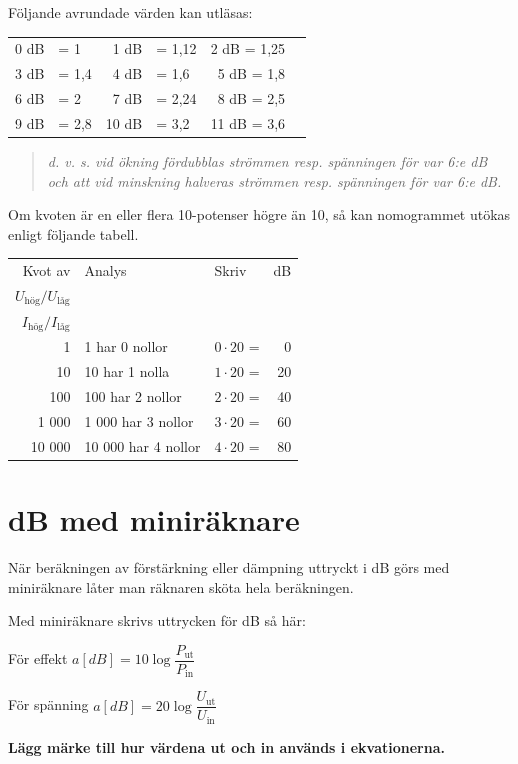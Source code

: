 Följande avrundade värden kan utläsas:

\begin{tabular}{rlrlrl}
0 dB & = 1   &  1 dB & = 1,12 &  2 dB = 1,25 \\
3 dB & = 1,4 &  4 dB & = 1,6  &  5 dB = 1,8 \\
6 dB & = 2   &  7 dB & = 2,24 &  8 dB = 2,5 \\
9 dB & = 2,8 & 10 dB & = 3,2  & 11 dB = 3,6
\end{tabular}

\begin{quote}\emph{
d. v. s. vid ökning fördubblas strömmen resp. spänningen för var 6:e dB och att
vid minskning halveras strömmen resp. spänningen för var 6:e dB.
}\end{quote}

Om kvoten är en eller flera 10-potenser högre än 10, så kan nomogrammet utökas
enligt följande tabell.

\begin{tabular}{rllr}
Kvot av & Analys             & Skriv            & dB \\
\(U_\text{hög}/U_\text{låg}\) &          &                  &    \\
\(I_\text{hög}/I_\text{låg}\) &          &                  &    \\
     1 & 1 har 0 nollor      & \(0 \cdot 20\) = &  0 \\
    10 & 10 har 1 nolla      & \(1 \cdot 20\) = & 20 \\
   100 & 100 har 2 nollor    & \(2 \cdot 20\) = & 40 \\
 1 000 &  1 000 har 3 nollor & \(3 \cdot 20\) = & 60 \\
10 000 & 10 000 har 4 nollor & \(4 \cdot 20\) = & 80
\end{tabular}

\section{dB med miniräknare}

När beräkningen av förstärkning eller dämpning uttryckt i dB görs med
miniräknare låter man räknaren sköta hela beräkningen.

Med miniräknare skrivs uttrycken för dB så här:

För effekt \(a[dB] = 10\log \dfrac{P_\text{ut}}{P_\text{in}}\)

För spänning \(a[dB] = 20\log \dfrac{U_\text{ut}}{U_\text{in}}\)

\textbf{Lägg märke till hur värdena ut och in används i ekvationerna.}


